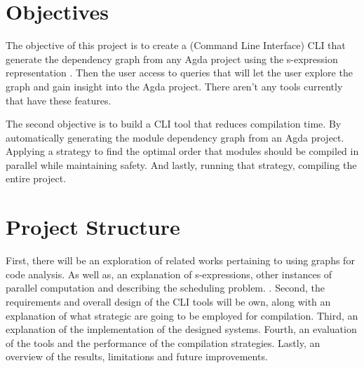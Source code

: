\section{Objectives}

The objective of this project is to create a (Command Line Interface) CLI that
generate the dependency graph from any Agda project using the s-expression
representation \cite{andrej}. Then the user access to queries that will let the
user explore the graph and gain insight into the Agda project. There aren't
any tools currently that have these features. 

The second objective is to build a CLI tool that reduces compilation time. By
automatically generating the module dependency graph from an Agda project.
Applying a strategy to find the optimal order that modules should be compiled
in parallel while maintaining safety. And lastly, running that strategy,
compiling the entire project.

\section{Project Structure} 

First, there will be an exploration of related works pertaining to using graphs
for code analysis. As well as, an explanation of s-expressions, other instances
of parallel computation and describing the scheduling problem. . Second, the requirements
and overall design of the CLI tools will be own, along with an explanation of
what strategic are going to be employed for compilation. Third, an explanation
of the implementation of the designed systems. Fourth, an evaluation of the
tools and the performance of the compilation strategies. Lastly, an overview of
the results, limitations and future improvements.
